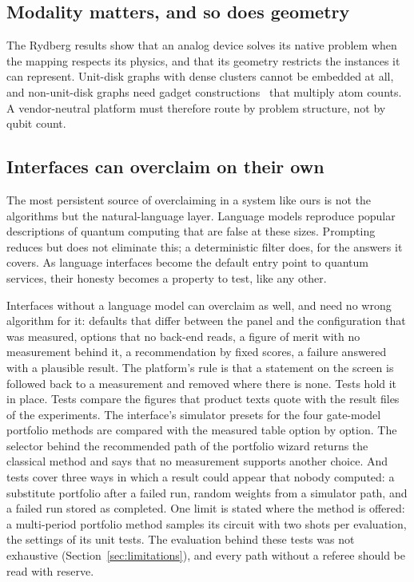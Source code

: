 \documentclass[11pt,a4paper]{article}
\begin{document}
\subsection{Modality matters, and so does geometry}

The Rydberg results show that an analog device solves its native problem
when the mapping respects its physics, and that its geometry restricts the
instances it can represent. Unit-disk graphs with dense clusters cannot be
embedded at all, and non-unit-disk graphs need gadget
constructions~\cite{nguyen2023} that multiply atom counts. A vendor-neutral
platform must therefore route by problem structure, not by qubit count.

\subsection{Interfaces can overclaim on their own}

The most persistent source of overclaiming in a system like ours is not the
algorithms but the natural-language layer. Language models reproduce popular
descriptions of quantum computing that are false at these sizes.
Prompting reduces but does not eliminate this; a deterministic filter does,
for the answers it covers. As
language interfaces become the default entry point to quantum services, their
honesty becomes a property to test, like any other.

Interfaces without a language model can overclaim as well, and need no wrong
algorithm for it: defaults that differ between the panel and the
configuration that was measured, options that no back-end reads, a figure
of merit with no measurement behind it, a recommendation by fixed scores, a
failure answered with a plausible result. The platform's rule is that a
statement on the screen is followed back to a measurement and removed where
there is none. Tests hold it in place. Tests compare the figures that
product texts quote with
the result files of the experiments. The interface's simulator presets for
the four gate-model portfolio methods are compared with the measured table
option by option. The selector behind the recommended path of the portfolio
wizard returns the classical method and says that no measurement supports
another choice. And tests cover three ways in which a result could appear
that nobody computed: a substitute portfolio after a failed run, random
weights from a simulator path, and a failed run stored as completed. One
limit is stated where the method
is offered: a multi-period portfolio method samples its
circuit with two shots per evaluation, the settings of its unit tests. The
evaluation behind these tests was not exhaustive
(Section~\ref{sec:limitations}), and every path without a referee should
be read with reserve.
\end{document}
